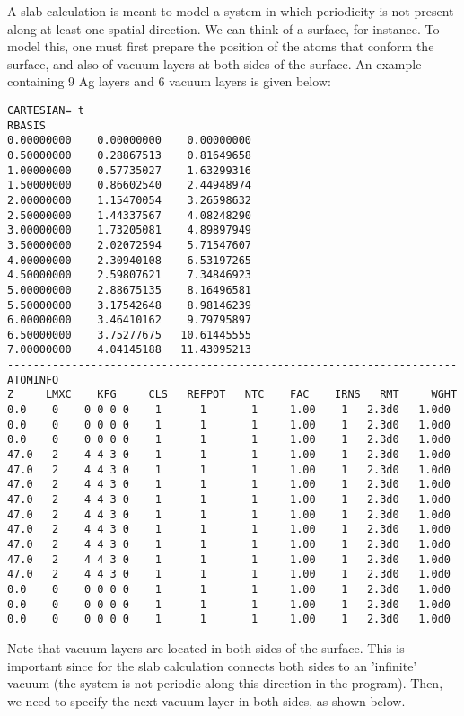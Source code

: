 \documentclass[a4paper,10pt,fullpage]{report}
\begin{document}
A slab calculation is meant to model a system in which periodicity is not
present along at least one spatial direction. We can think of a surface, for instance. 
To model this, one must first prepare the position of the atoms that conform the surface,
and also of vacuum layers at both sides of the surface. An example containing
9 Ag layers and 6 vacuum layers is given below:
\begin{verbatim}
CARTESIAN= t
RBASIS
0.00000000    0.00000000    0.00000000
0.50000000    0.28867513    0.81649658
1.00000000    0.57735027    1.63299316
1.50000000    0.86602540    2.44948974
2.00000000    1.15470054    3.26598632
2.50000000    1.44337567    4.08248290
3.00000000    1.73205081    4.89897949
3.50000000    2.02072594    5.71547607
4.00000000    2.30940108    6.53197265
4.50000000    2.59807621    7.34846923
5.00000000    2.88675135    8.16496581
5.50000000    3.17542648    8.98146239
6.00000000    3.46410162    9.79795897
6.50000000    3.75277675   10.61445555
7.00000000    4.04145188   11.43095213
----------------------------------------------------------------------
ATOMINFO
Z     LMXC    KFG     CLS   REFPOT   NTC    FAC    IRNS   RMT     WGHT
0.0    0    0 0 0 0    1      1       1     1.00    1   2.3d0   1.0d0
0.0    0    0 0 0 0    1      1       1     1.00    1   2.3d0   1.0d0
0.0    0    0 0 0 0    1      1       1     1.00    1   2.3d0   1.0d0
47.0   2    4 4 3 0    1      1       1     1.00    1   2.3d0   1.0d0
47.0   2    4 4 3 0    1      1       1     1.00    1   2.3d0   1.0d0
47.0   2    4 4 3 0    1      1       1     1.00    1   2.3d0   1.0d0
47.0   2    4 4 3 0    1      1       1     1.00    1   2.3d0   1.0d0
47.0   2    4 4 3 0    1      1       1     1.00    1   2.3d0   1.0d0
47.0   2    4 4 3 0    1      1       1     1.00    1   2.3d0   1.0d0
47.0   2    4 4 3 0    1      1       1     1.00    1   2.3d0   1.0d0
47.0   2    4 4 3 0    1      1       1     1.00    1   2.3d0   1.0d0
47.0   2    4 4 3 0    1      1       1     1.00    1   2.3d0   1.0d0
0.0    0    0 0 0 0    1      1       1     1.00    1   2.3d0   1.0d0
0.0    0    0 0 0 0    1      1       1     1.00    1   2.3d0   1.0d0
0.0    0    0 0 0 0    1      1       1     1.00    1   2.3d0   1.0d0
\end{verbatim}
Note that vacuum layers are located in both sides of the surface. 
This is important since for the slab calculation 
connects both sides to an 'infinite' vacuum (the system is not
periodic along this direction in the program). Then,
we need to specify the next vacuum layer in both
sides, as shown below.
\end{document}
